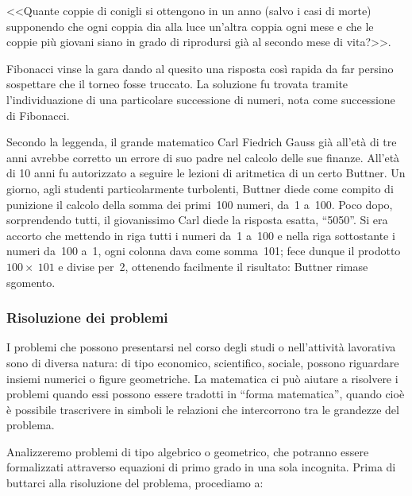 <<Quante coppie di conigli si ottengono in un anno (salvo i
casi di morte) supponendo che ogni coppia dia alla luce
un'altra coppia ogni mese e che le coppie più
giovani siano in grado di riprodursi già al secondo mese di
vita?>>.

Fibonacci vinse la gara dando al quesito una risposta così rapida da
far persino sospettare che il torneo fosse truccato. La soluzione fu
trovata tramite l'individuazione di una particolare
successione di numeri, nota come successione di Fibonacci.

Secondo la leggenda, il grande matematico Carl Fiedrich Gauss già
all'età di tre anni avrebbe corretto un errore di
suo padre nel calcolo delle sue finanze. 
All'età di 10 anni fu autorizzato a seguire le lezioni di aritmetica 
di un certo Buttner. 
Un giorno, agli studenti particolarmente turbolenti, Buttner
diede come compito di punizione il calcolo della somma dei primi~100
numeri, da~1 a~100. Poco dopo, sorprendendo tutti, il giovanissimo Carl
diede la risposta esatta, ``5050''.
Si era accorto che mettendo in riga tutti i numeri da~1 a~100 e nella
riga sottostante i numeri da~100 a~1, ogni colonna dava come somma~101;
fece dunque il prodotto~\(100\times~101\) e divise per~2, ottenendo 
facilmente il risultato: Buttner rimase sgomento.

\subsubsection{Risoluzione dei problemi}


I problemi che possono presentarsi nel corso degli studi o
nell'attività lavorativa sono di diversa natura: di
tipo economico, scientifico, sociale, possono riguardare insiemi
numerici o figure geometriche. La matematica ci può aiutare a
risolvere i problemi quando essi possono essere tradotti in
``forma matematica'', quando cioè
è possibile trascrivere in simboli le relazioni che intercorrono
tra le grandezze del problema.

Analizzeremo problemi di tipo algebrico o geometrico, che potranno
essere formalizzati attraverso equazioni di primo grado in una sola
incognita. Prima di buttarci alla risoluzione del problema, procediamo a:

